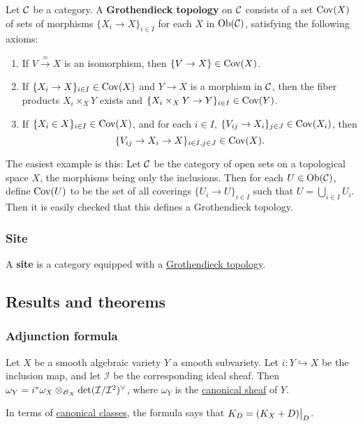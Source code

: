 \documentclass[11pt, english]{article}
\begin{document}
Let $\mathcal{C}$ be a category. A \textbf{Grothendieck topology} on $\mathcal{C}$ consists of a set $\operatorname{Cov}(X)$ of sets of morphisms $\{ X_i \to X\}_{i \in I}$ for each $X$ in $\mathrm{Ob}(\mathcal{C})$, satisfying the following axioms:
\begin{enumerate}
\item If $V \xrightarrow{\approx} X$ is an isomorphism, then $\{ V \to X\} \in \operatorname{Cov}(X)$.
\item If $\{X_i \to X\}_{i \in I} \in \operatorname{Cov}(X)$ and $Y \to X$ is a morphism in $\mathcal{C}$, then the fiber products $X_i \times_X Y$ exists and ${\{ X_i \times_X Y \to Y\}_{i \in I} \in \operatorname{Cov}(Y)}$.
\item If $\{X_i \in X\}_{i \in I} \in \operatorname{Cov}(X)$, and for each $i \in I$, $\{ V_{ij} \to X_i\}_{j \in J} \in  \operatorname{Cov}(X_i)$, then
\[
\{ V_{ij} \to X_i \to X\}_{i \in I, j \in J} \in \operatorname{Cov}(X).
\]
\end{enumerate}

The easiest example is this: Let $\mathcal{C}$ be the category of open sets on a topological space $X$, the morphisms being only the inclusions. Then for each $U \in \mathrm{Ob}(\mathcal{C})$, define $\operatorname{Cov}(U)$ to be the set of all coverings $\{ U_i \to U \}_{i \in I}$ such that $U = \bigcup_{i\in I} U_i$. Then it is easily checked that this defines a Grothendieck topology.

\subsubsection{Site}
\label{site}

A \textbf{site} is a category equipped with a \hyperref[grothendiecktopology]{Grothendieck topology}.

\subsection{Results and theorems}
\subsubsection{Adjunction formula}
\label{adjunction}

Let $X$ be a smooth algebraic variety $Y$ a smooth subvariety. Let $i:Y \hookrightarrow X$ be the inclusion map, and let $\mathcal I$ be the corresponding ideal sheaf. Then $\omega_Y = i^\ast \omega_X \otimes_{\operatorname{\mathscr{O}}_X} \det(\mathcal I/\mathcal I^2)^\vee$, where $\omega_Y$ is the \hyperref[canonicalsheaf]{canonical sheaf} of $Y$.

In terms of \hyperref[canonicaldivisor]{canonical classes}, the formula says that $K_D = \restr{(K_X + D)}{D}$. 
\end{document}
